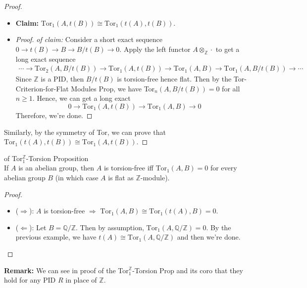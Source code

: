 \begin{proof}
    \begin{itemize}
        \item \textbf{Claim:} $\text{Tor}_1 (A,t(B)) \cong \text{Tor}_1 (t(A),t(B))$.

        \item \begin{proof}
            \textit{of claim:} Consider a short exact sequence $0\to t(B) \to B\to B/t(B) \to 0$. Apply the left functor $A\otimes_\mathbb{Z} \cdot$ to get a long exact sequence
            \begin{align*}
                \cdots \to \text{Tor}_2 (A,B/t(B)) \to \text{Tor}_1 (A,t(B)) \to \text{Tor}_1 (A,B) \to \text{Tor}_1 (A,B/t(B)) \to \cdots
            \end{align*}
            Since $\mathbb{Z}$ is a PID, then $B/t(B)$ is torsion-free hence flat. Then by the Tor-Criterion-for-Flat Modules Prop, we have Tor$_n (A,B/t(B))=0$ for all $n\geq 1$. Hence, we can get a long exact
            \[
            0\to \text{Tor}_1 (A,t(B)) \to \text{Tor}_1 (A,B) \to 0
            \]
            Therefore, we're done.
        \end{proof}
    \end{itemize}
    Similarly, by the symmetry of Tor, we can prove that $\text{Tor}_1 (t(A),t(B)) \cong \text{Tor}_1 (A,t(B))$.
\end{proof}

\begin{corollary}{of Tor$_1^\mathbb{Z}$-Torsion Proposition}\\
If $A$ is an abelian group, then $A$ is torsion-free iff $\text{Tor}_1 (A,B)=0$ for every abelian group $B$ (in which case $A$ is flat as $\mathbb{Z}$-module).
\end{corollary}

\begin{proof}
    \begin{itemize}
        \item ($\Rightarrow$): $A$ is torsion-free $\Rightarrow$ $\text{Tor}_1(A,B) \cong \text{Tor}_1 (t(A),B)=0$.
        \item ($\Leftarrow$): Let $B=\mathbb{Q}/\mathbb{Z}$. Then by assumption, $\text{Tor}_1 (A,\mathbb{Q}/\mathbb{Z})=0$. By the previous example, we have $t(A) \cong \text{Tor}_1 (A,\mathbb{Q} /\mathbb{Z})$ and then we're done.
    \end{itemize}
\end{proof}

\noindent\textbf{Remark:} We can see in proof of the Tor$_1^\mathbb{Z}$-Torsion Prop and its coro that they hold for any PID $R$ in place of $\mathbb{Z}$.



